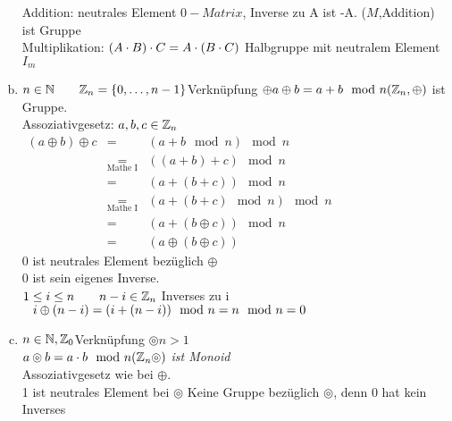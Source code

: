 \begin{enumerate}[a)]
Addition: neutrales Element $0-Matrix$, Inverse zu A ist -A. ($M$,Addition) ist Gruppe\\
Multiplikation: $(A \cdot B) \cdot C = A \cdot (B \cdot C)$ Halbgruppe mit neutralem Element $I_m$
\item $n \in \mathbb{N}\qquad \mathbb{Z}_n = \{0,\ldots,n-1 \}$\qquad Verknüpfung $\oplus\\
a \oplus b = a + b \mod n\\
(\mathbb{Z}_n, \oplus )$ ist Gruppe.\\
Assoziativgesetz: $a,b,c \in \mathbb{Z}_n$\\
$\begin{array}{lcl}
(a \oplus b)\oplus c &=& (a+b \mod n)\mod n\\
&\underset{\text{Mathe I}}{=}& ((a + b) + c) \mod n\\
&=& (a + (b + c)) \mod n\\
&\underset{\text{Mathe I}}{=}& (a + (b + c)\mod n)\mod n\\
&=& (a + (b \oplus c)) \mod n\\
&=& (a \oplus (b \oplus c))
\end{array}$\\
0 ist neutrales Element bezüglich $\oplus$\\
0 ist sein eigenes Inverse.\\
$1 \leq i \leq n \qquad n - i \in \mathbb{Z}_n$ Inverses zu i\\
$\phantom{=}i \oplus (n - i)\\
=(i+ (n-i))\mod n
=n \mod n = 0$
\item $n \in \mathbb{N}, \mathbb{Z}_0$\qquad Verknüpfung $\circledcirc$\qquad $\mathit{n > 1}$\\
$a \circledcirc b = a \cdot b \mod n\\
\mathit{(\mathbb{Z}_n \circledcirc)}$ \emph{ist Monoid}\\
Assoziativgesetz wie bei $\oplus$.\\
1 ist neutrales Element bei $\circledcirc$ Keine Gruppe bezüglich $\circledcirc$, denn 0 hat kein Inverses 
\end{enumerate}
